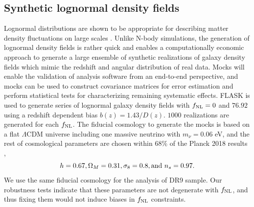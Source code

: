 \subsection{Synthetic lognormal density fields}
Lognormal distributions are shown to be appropriate for describing matter density fluctuations on large scales \citep{coles1991}. Unlike N-body simulations, the generation of lognormal density fields is rather quick and enables a computationally economic approach to generate a large ensemble of synthetic realizations of galaxy density fields which mimic the redshift and angular distribution of real data. Mocks will enable the validation of analysis software from an end-to-end perspective, and mocks can be used to construct covariance matrices for error estimation and perform statistical tests for characterizing remaining systematic effects. \textsc{FLASK}  \citep[Full-sky Lognormal Astro-fields Simulation Kit;][]{Xavier_2016} is used to generate series of lognormal galaxy density fields with $f_{\rm NL}=0$ and $76.92$ using a redshift dependent bias $b(z)=1.43/D(z)$. $1000$ realizations are generated for each $f_{\rm NL}$. The fiducial cosmology to generate the mocks is based on a flat $\Lambda$CDM universe including one massive neutrino with $m_{\nu}=0.06$ eV, and the rest of cosmological parameters are chosen within $68\%$ of the Planck 2018 results \citep{aghanim2020planck},
\begin{equation*}
    h = 0.67,  \Omega_{M}=0.31, \sigma_{8}=0.8, {\rm and}~ n_{s}=0.97.
\end{equation*}
We use the same fiducial cosmology for the analysis of DR9 sample. Our robustness tests indicate that these parameters are not degenerate with $f_{\rm NL}$, and thus fixing them would not induce biases in $f_{\rm NL}$ constraints.
